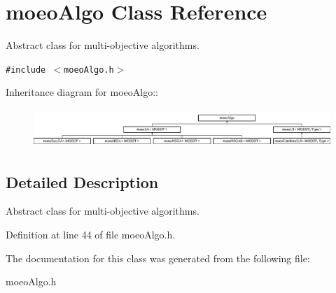 \section{moeo\-Algo Class Reference}
\label{classmoeoAlgo}
Abstract class for multi-objective algorithms.  


{\tt \#include $<$moeo\-Algo.h$>$}

Inheritance diagram for moeo\-Algo::\begin{figure}[H]
\begin{center}
\leavevmode
\includegraphics[height=1.47368cm]{classmoeoAlgo}
\end{center}
\end{figure}


\subsection{Detailed Description}
Abstract class for multi-objective algorithms. 



Definition at line 44 of file moeo\-Algo.h.

The documentation for this class was generated from the following file:\begin{CompactItemize}
\item 
moeo\-Algo.h\end{CompactItemize}
